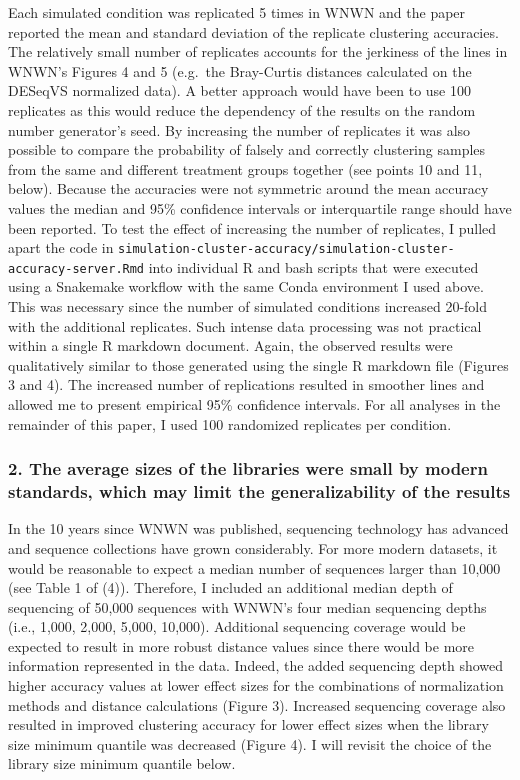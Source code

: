 \documentclass[
]{article}
\begin{document}
Each simulated condition was replicated 5 times in WNWN and the paper
reported the mean and standard deviation of the replicate clustering
accuracies. The relatively small number of replicates accounts for the
jerkiness of the lines in WNWN's Figures 4 and 5 (e.g.~the Bray-Curtis
distances calculated on the DESeqVS normalized data). A better approach
would have been to use 100 replicates as this would reduce the
dependency of the results on the random number generator's seed. By
increasing the number of replicates it was also possible to compare the
probability of falsely and correctly clustering samples from the same
and different treatment groups together (see points 10 and 11, below).
Because the accuracies were not symmetric around the mean accuracy
values the median and 95\% confidence intervals or interquartile range
should have been reported. To test the effect of increasing the number
of replicates, I pulled apart the code in
\texttt{simulation-cluster-accuracy/simulation-cluster-accuracy-server.Rmd}
into individual R and bash scripts that were executed using a Snakemake
workflow with the same Conda environment I used above. This was
necessary since the number of simulated conditions increased 20-fold
with the additional replicates. Such intense data processing was not
practical within a single R markdown document. Again, the observed
results were qualitatively similar to those generated using the single R
markdown file (Figures 3 and 4). The increased number of replications
resulted in smoother lines and allowed me to present empirical 95\%
confidence intervals. For all analyses in the remainder of this paper, I
used 100 randomized replicates per condition.

\hypertarget{the-average-sizes-of-the-libraries-were-small-by-modern-standards-which-may-limit-the-generalizability-of-the-results}{%
\subsubsection{2. The average sizes of the libraries were small by
modern standards, which may limit the generalizability of the
results}\label{the-average-sizes-of-the-libraries-were-small-by-modern-standards-which-may-limit-the-generalizability-of-the-results}}

In the 10 years since WNWN was published, sequencing technology has
advanced and sequence collections have grown considerably. For more
modern datasets, it would be reasonable to expect a median number of
sequences larger than 10,000 (see Table 1 of (4)). Therefore, I included
an additional median depth of sequencing of 50,000 sequences with WNWN's
four median sequencing depths (i.e., 1,000, 2,000, 5,000, 10,000).
Additional sequencing coverage would be expected to result in more
robust distance values since there would be more information represented
in the data. Indeed, the added sequencing depth showed higher accuracy
values at lower effect sizes for the combinations of normalization
methods and distance calculations (Figure 3). Increased sequencing
coverage also resulted in improved clustering accuracy for lower effect
sizes when the library size minimum quantile was decreased (Figure 4). I
will revisit the choice of the library size minimum quantile below.
\end{document}

